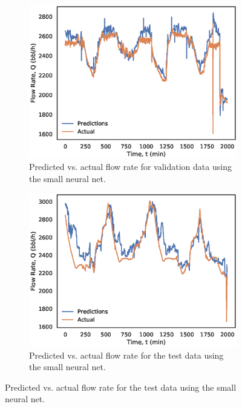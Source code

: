 \begin{figure}[p]
     \centering
     \begin{subfigure}[b]{0.48\textwidth}
         \includegraphics[width=\textwidth]{images/08smallnn_valid.eps}
         \caption{Predicted vs. actual flow rate for validation data using the small neural net.}
         \label{fig:08smallnn_valid}
     \end{subfigure}
     \begin{subfigure}[b]{0.48\textwidth}
         \includegraphics[width=\textwidth]{images/08smallnn_test.eps}
         \caption{Predicted vs. actual flow rate for the test data using the small neural net.}
         \label{fig:08smallnn_test}
     \end{subfigure}

\end{figure}
